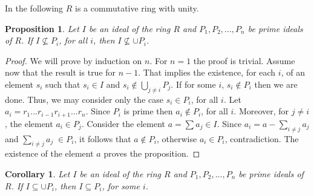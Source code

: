 \documentclass[12pt]{article}
\newtheorem{proposition}{Proposition}
\newtheorem{corollary}{Corollary}
\begin{document}
 In the following $R$ is a commutative ring with unity.
\begin{proposition} Let $I$ be an ideal of the ring $R$ and $P_1, P_2, ... ,P_n$ be prime ideals of $R$. If $I\not\subseteq P_i$, for all $i$, then $I \not\subseteq \cup P_i$.\end{proposition}\begin{proof} We will prove by induction on $n$. For $n=1$ the proof is trivial. Assume now that the result is true for $n-1$. That implies the existence, for each $i$, of an element $s_i$ such that $s_i\in I$ and $s_i \not\in \bigcup_{j\ne i}P_j$. If for some $i$, $s_i\not\in P_i$ then we are done. Thus, we may consider only the case $s_i \in P_i$, for all $i$.\newline
 Let $a_i = r_1...r_{i-1}r_{i+1}...r_n$. Since $P_i$ is prime then $a_i\not\in P_i$, for all $i$. Moreover, for $j \ne i$, the element $a_i \in P_j$. Consider the element $a = \sum a_j \in I$. Since $a_i = a - \sum_{i\ne j} a_j$ and $\sum_{i\ne j} a_j\;\in P_i$, it follows that $a \not\in P_i$, otherwise $a_i\in P_i$, contradiction. The existence of the element $a$ proves the proposition.\end{proof}
\begin{corollary} Let $I$ be an ideal of the ring $R$ and $P_1,P_2,...,P_n$ be prime ideals of $R$. If $I \subseteq \cup P_i$, then $I\subseteq P_i$, for some $i$.\end{corollary}    
\end{document}
